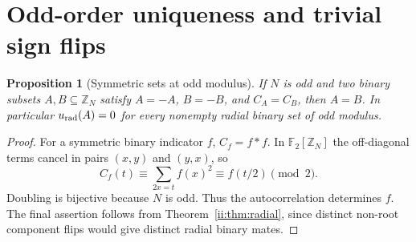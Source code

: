 \documentclass[11pt]{article}
\numberwithin{equation}{section}
\newtheorem{proposition}[theorem]{Proposition}
\theoremstyle{definition}
\theoremstyle{remark}
\begin{document}
\section{Odd-order uniqueness and trivial sign flips}

\begin{proposition}[Symmetric sets at odd modulus]\label{ii:prop:odd}
If $N$ is odd and two binary subsets $A,B\subseteq\mathbb Z_N$ satisfy $A=-A$, $B=-B$, and $C_A=C_B$, then $A=B$.  In particular $u_{\rm rad}(A)=0$ for every nonempty radial binary set of odd modulus.
\end{proposition}
\begin{proof}
For a symmetric binary indicator $f$, $C_f=f*f$.  In $\mathbb F_2[\mathbb Z_N]$ the off-diagonal terms cancel in pairs $(x,y)$ and $(y,x)$, so
\[
 C_f(t)\equiv\sum_{2x=t}f(x)^2\equiv f(t/2)\pmod2.
\]
Doubling is bijective because $N$ is odd.  Thus the autocorrelation determines $f$.  The final assertion follows from Theorem~\ref{ii:thm:radial}, since distinct non-root component flips would give distinct radial binary mates.
\end{proof}
\end{document}
